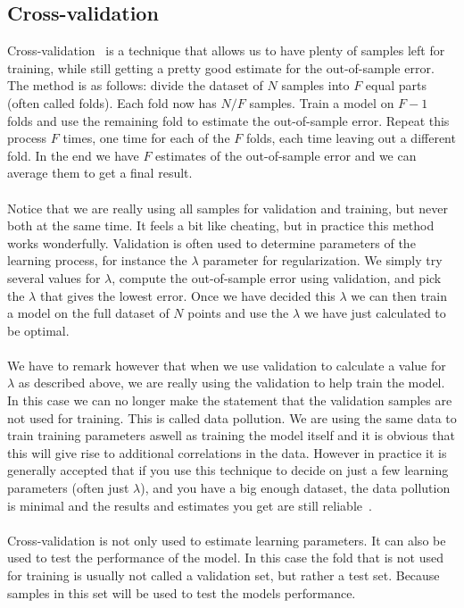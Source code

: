 \subsection{Cross-validation}
Cross-validation~\cite{caltechmachinelearning}\cite{kohavi1995study} is a technique that allows us to have plenty of samples left for training, while still getting a pretty good estimate for the out-of-sample error. The method is as follows: divide the dataset of $N$ samples into $F$ equal parts (often called folds). Each fold now has $N/F$ samples. Train a model on $F-1$ folds and use the remaining fold to estimate the out-of-sample error. Repeat this process $F$ times, one time for each of the $F$ folds, each time leaving out a different fold. In the end we have $F$ estimates of the out-of-sample error and we can average them to get a final result.\\ \\
Notice that we are really using all samples for validation and training, but never both at the same time. It feels a bit like cheating, but in practice this method works wonderfully. Validation is often used to determine parameters of the learning process, for instance the $\lambda$ parameter for regularization. We simply try several values for $\lambda$, compute the out-of-sample error using validation, and pick the $\lambda$ that gives the lowest error. Once we have decided this $\lambda$ we can then train a model on the full dataset of $N$ points and use the $\lambda$ we have just calculated to be optimal. \\ \\
We have to remark however that when we use validation to calculate a value for $\lambda$ as described above, we are really using the validation to help train the model. In this case we can no longer make the statement that the validation samples are not used for training. This is called data pollution. We are using the same data to train training parameters aswell as training the model itself and it is obvious that this will give rise to additional correlations in the data. However in practice it is generally accepted that if you use this technique to decide on just a few learning parameters (often just $\lambda$), and you have a big enough dataset, the data pollution is minimal and the results and estimates you get are still reliable~\cite{caltechmachinelearning}. \\ \\

Cross-validation is not only used to estimate learning parameters. It can also be used to test the performance of the model. In this case the fold that is not used for training is usually not called a validation set, but rather a test set. Because samples in this set will be used to test the models performance. 

